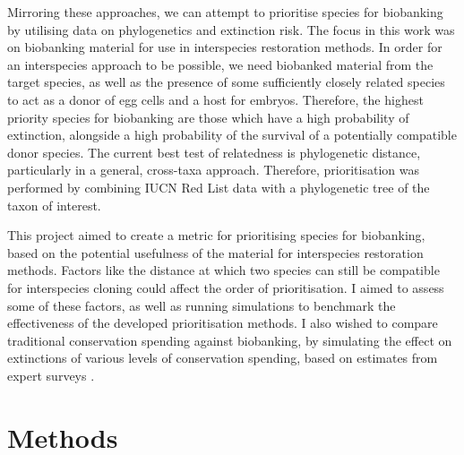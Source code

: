 \documentclass[12pt]{article}
\begin{document}
	Mirroring these approaches, we can attempt to prioritise species for biobanking
	by utilising data on phylogenetics and extinction risk.
	The focus in this work was on biobanking material for use in interspecies
	restoration methods. In order for an
	interspecies approach to be possible, we need biobanked material from the target
	species, as well as the presence of some sufficiently closely related species to act
	as a donor of egg cells and a host for embryos. Therefore, the highest priority species
	for biobanking are those which have a high probability of extinction, alongside a high
	probability of the survival of a potentially compatible donor species. The current best test of
	relatedness is phylogenetic distance, particularly in a general, cross-taxa approach. Therefore, prioritisation was performed
	by combining IUCN Red List data with a phylogenetic tree of the taxon of 
	interest.
	
	This project aimed to create a metric for prioritising species for
	biobanking, based on the potential usefulness of the material for interspecies
	restoration methods. Factors like the distance at which two species can still
	be compatible for interspecies cloning could affect the order of
	prioritisation. I aimed to assess some of these factors, as well as running
	simulations to benchmark the effectiveness of the developed prioritisation
	methods. I also wished to compare
	traditional conservation spending against biobanking, by simulating the
	effect on extinctions of various levels of conservation spending, based on
	estimates from expert surveys
	\citep{mccarthyFinancialCostsMeeting2012,nunesPriceConservingAvian2015}.

	
	\pagebreak
	
	\section{Methods}
\end{document}
